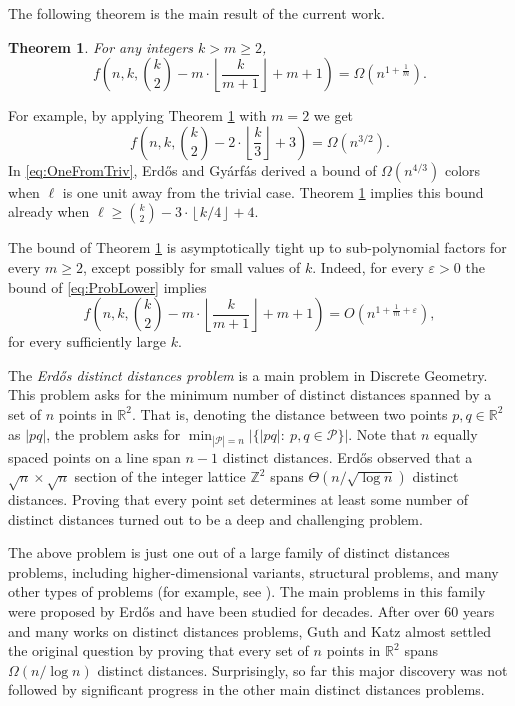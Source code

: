 \documentclass[11pt]{article}
\newtheorem{theorem}{Theorem}[section]
\newcounter{problems}
\newcommand{\parag}[1]{\vspace{2mm}

\noindent{\bf #1} }
\newcommand{\ZZ}{\ensuremath{\mathbb Z}}
\newcommand{\RR}{\ensuremath{\mathbb R}}
\newcommand{\pts}{\mathcal P}
\def\eps{{\varepsilon}}
\begin{document}
The following theorem is the main result of the current work.
%
\begin{theorem} \label{th:LocalProp}
For any integers $k > m \ge 2$,
%
\[ f\left(n,k,\binom{k}{2} -  m\cdot \left\lfloor\frac{k}{m+1}\right\rfloor  + m+1 \right) = \Omega\left(n^{1+\frac{1}{m}}\right). \]
\end{theorem}

For example, by applying Theorem \ref{th:LocalProp} with $m=2$ we get
%
\[ f\left(n,k,\binom{k}{2} - 2\cdot \left\lfloor\frac{k}{3}\right\rfloor + 3 \right) = \Omega\left(n^{3/2}\right). \]
%
In \eqref{eq:OneFromTriv}, Erd\H os and Gy\'arf\'as derived a bound of $\Omega(n^{4/3})$ colors when $\ell$ is one unit away from the trivial case.
Theorem \ref{th:LocalProp} implies this bound already when $\ell \ge \binom{k}{2} - 3\cdot \left\lfloor k/4\right\rfloor + 4$.

The bound of Theorem \ref{th:LocalProp} is asymptotically tight up to sub-polynomial factors for every $m\ge 2$, except possibly for small values of $k$.
Indeed, for every $\eps>0$ the bound of \eqref{eq:ProbLower} implies
%
\[ f\left(n,k,\binom{k}{2} -  m\cdot \left\lfloor\frac{k}{m+1}\right\rfloor  + m+1 \right) = O\left(n^{1+\frac{1}{m}+\eps}\right), \]
%
for every sufficiently large $k$.

\parag{Distinct distances with local properties. }
The \emph{Erd\H os distinct distances problem} is a main problem in Discrete Geometry.
This problem asks for the minimum number of distinct distances spanned by a set of $n$ points in $\RR^2$.
That is, denoting the distance between two points $p, q \in \RR^2$ as $|pq|$, the problem asks for $\min_{|\pts|=n} |\{|pq| :\  p, q \in \pts \}|$.
Note that $n$ equally spaced points on a line span $n-1$ distinct distances.
Erd\H os \cite{erd46} observed that a $\sqrt{n}\times \sqrt{n}$ section of the integer lattice $\ZZ^2$ spans $\Theta(n/\sqrt{\log n})$ distinct distances.
Proving that every point set determines at least some number of distinct distances turned out to be a deep and challenging problem.

The above problem is just one out of a large family of distinct distances problems, including higher-dimensional variants, structural problems, and many other types of problems (for example, see \cite{Sheffer14}).
The main problems in this family were proposed by Erd\H os and have been studied for decades.
After over 60 years and many works on distinct distances problems, Guth and Katz \cite{GK15} almost settled the original question by proving that every set of $n$ points in $\RR^2$ spans $\Omega(n/ \log n)$ distinct distances.
Surprisingly, so far this major discovery was not followed by significant progress in the other main distinct distances problems.
\end{document}

